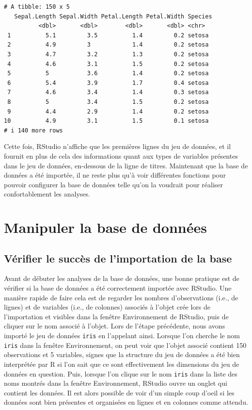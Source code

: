 \documentclass[
  letterpaper,
]{book}
\begin{document}
\begin{verbatim}
# A tibble: 150 x 5
   Sepal.Length Sepal.Width Petal.Length Petal.Width Species
          <dbl>       <dbl>        <dbl>       <dbl> <chr>  
 1          5.1         3.5          1.4         0.2 setosa 
 2          4.9         3            1.4         0.2 setosa 
 3          4.7         3.2          1.3         0.2 setosa 
 4          4.6         3.1          1.5         0.2 setosa 
 5          5           3.6          1.4         0.2 setosa 
 6          5.4         3.9          1.7         0.4 setosa 
 7          4.6         3.4          1.4         0.3 setosa 
 8          5           3.4          1.5         0.2 setosa 
 9          4.4         2.9          1.4         0.2 setosa 
10          4.9         3.1          1.5         0.1 setosa 
# i 140 more rows
\end{verbatim}

Cette fois, RStudio n'affiche que les premières lignes du jeu de
données, et il fournit en plus de cela des informations quant aux types
de variables présentes dans le jeu de données, en-dessous de la ligne de
titres. Maintenant que la base de données a été importée, il ne reste
plus qu'à voir différentes fonctions pour pouvoir configurer la base de
données telle qu'on la voudrait pour réaliser confortablement les
analyses.

\section{Manipuler la base de
données}\label{manipuler-la-base-de-donnuxe9es}

\subsection{Vérifier le succès de l'importation de la
base}\label{vuxe9rifier-le-succuxe8s-de-limportation-de-la-base}

Avant de débuter les analyses de la base de données, une bonne pratique
est de vérifier si la base de données a été correctement importée avec
RStudio. Une manière rapide de faire cela est de regarder les nombres
d'observations (i.e., de lignes) et de variables (i.e., de colonnes)
associés à l'objet crée lors de l'importation et visibles dans la
fenêtre Environnement de RStudio, puis de cliquer sur le nom associé à
l'objet. Lors de l'étape précédente, nous avons importé le jeu de
données \texttt{iris} en l'appelant ainsi. Lorsque l'on cherche le nom
\texttt{iris} dans la fenêtre Environnement, on peut voir que l'objet
associé contient 150 observations et 5 variables, signes que la
structure du jeu de données a été bien interprétée par R si l'on sait
que ce sont effectivement les dimensions du jeu de données en question.
Puis, lorsque l'on clique sur le nom \texttt{iris} dans la liste des
noms montrés dans la fenêtre Environnement, RStudio ouvre un onglet qui
contient les données. Il est alors possible de voir d'un simple coup
d'oeil si les données sont bien présentes et organisées en lignes et en
colonnes comme attendu.
\end{document}
